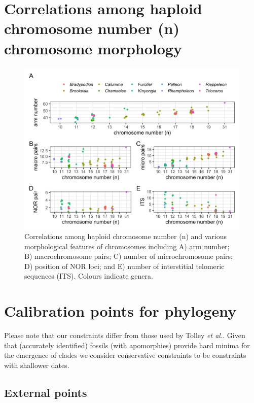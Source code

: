 \documentclass[a4paper, 12pt]{article}
\begin{document}
\newpage
\section{Correlations among haploid chromosome number (n) chromosome morphology}

\begin{figure}[H]
 \centering
  \includegraphics[width = \linewidth]{figures/morphology-chromono.png}
  \caption{Correlations among haploid chromosome number (n) and various morphological features of chromosomes including A) arm number; B) macrochromosome pairs; C) number of microchromosome pairs; D) position of NOR loci; and E) number of interstitial telomeric sequences (ITS). Colours indicate genera.
}
  \label{fig-morph}
\end{figure} 

\newpage
\section{Calibration points for phylogeny}

Please note that our constraints differ from those used by Tolley \textit{et al.}\cite{tolley2013large}. Given that (accurately identified) fossils (with apomorphies) provide hard minima for the emergence of clades we consider conservative constraints to be constraints with shallower dates.
 
\subsection{External points}
 
\end{document}
